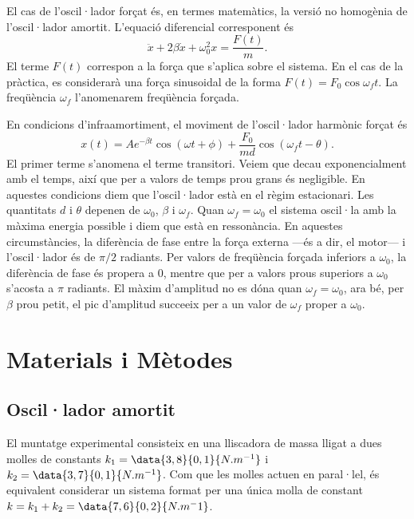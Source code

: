 \documentclass[12pt,a4paper]{article}
\begin{document}
El cas de l'oscil·lador forçat és, en termes matemàtics, la versió no homogènia de l'oscil·lador amortit. L'equació diferencial corresponent és 
\begin{equation}
  \ddot{x} + 2\beta\dot{x} + \omega_0^2x = \dfrac{F(t)}{m}. \label{eq:oscilador harmonic forçat}
\end{equation}
El terme \( F(t) \) correspon a la força que s'aplica sobre el sistema. En el cas de la pràctica, es considerarà una força sinusoidal de la forma \( F(t) = F_0 \cos{\omega_f t} \). La freqüència \( \omega_f \) l'anomenarem freqüència forçada. 

En condicions d'infraamortiment, el moviment de l'oscil·lador harmònic forçat és
\begin{equation}
 	x(t) = Ae^{-\beta t}\cos({\omega t + \phi}) + \dfrac{F_0}{md}\cos({\omega_f t - \theta}). \label{eq:solucions mhf}	
\end{equation}
El primer terme s'anomena el terme transitori. Veiem que decau exponencialment amb el temps, així que per a valors de temps prou grans és negligible. En aquestes condicions diem que l'oscil·lador està en el règim estacionari. Les quantitats \( d \) i \( \theta \) depenen de \( \omega_0 \), \( \beta \) i \( \omega_f \). Quan \( \omega_f = \omega_0 \) el sistema oscil·la amb la màxima energia possible i diem que està en ressonància. En aquestes circumstàncies, la diferència de fase entre la força externa ---és a dir, el motor--- i l'oscil·lador és de \( \pi/2 \) radiants. Per valors de freqüència forçada inferiors a \( \omega_0 \), la diferència de fase és propera a 0, mentre que per a valors prous superiors a \( \omega_0 \) s'acosta a \( \pi \) radiants. El màxim d'amplitud no es dóna quan \( \omega_f = \omega_0 \), ara bé, per \( \beta \) prou petit, el pic d'amplitud succeeix per a un valor de \( \omega_f \) proper a \( \omega_0 \).  

\section{Materials i Mètodes}\label{sec:metodes}
\subsection{Oscil·lador amortit}
El muntatge experimental consisteix en una lliscadora de massa  lligat a dues molles de constants \( k_1 = \data{3,8}{0,1}{N.m^{-1}} \) i \( k_2 = \data{3,7}{0,1}{N.m^{-1}} \). Com que les molles actuen en paral·lel, és equivalent considerar un sistema format per una única molla de constant \( k = k_1 + k_2 = \data{7,6}{0,2}{N.m^-1} \).
\end{document}
